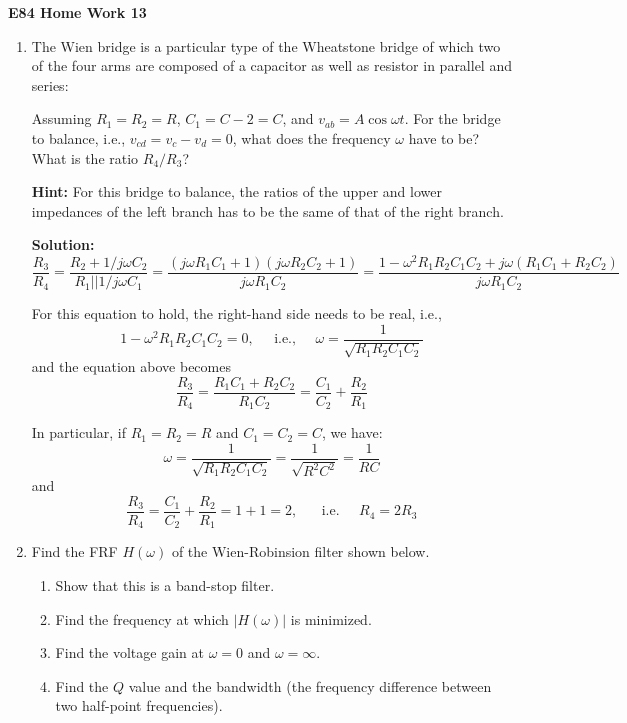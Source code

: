 \usepackage{html}

\begin{center}
{\Large \bf  E84 Home Work 13}
\end{center}
\begin{enumerate}

\item The Wien bridge is a particular type of the Wheatstone bridge 
  of which two of the four arms are composed of a capacitor as well 
  as resistor in parallel and series:


  Assuming $R_1=R_2=R$, $C_1=C-2=C$, and $v_{ab}=A\cos\omega t$. For the
  bridge to balance, i.e., $v_{cd}=v_c-v_d=0$, what does the frequency 
  $\omega$ have to be? What is the ratio $R_4/R_3$?

  {\bf Hint:} For this bridge to balance, the ratios of the upper and
  lower impedances of the left branch has to be the same of that of
  the right branch.

  {\bf Solution:}
  \[
  \frac{R_3}{R_4}=\frac{R_2+1/j\omega C_2}{R_1||1/j\omega C_1}
  =\frac{(j\omega R_1C_1+1)(j\omega R_2C_2+1)}{j\omega R_1C_2}
  =\frac{1-\omega^2R_1R_2C_1C_2+j\omega(R_1C_1+R_2C_2)}{j\omega R_1C_2}
  \]

  For this equation to hold, the right-hand side needs to be real, i.e., 
  \[
  1-\omega^2R_1R_2C_1C_2=0,\;\;\;\;\;\mbox{i.e.,}\;\;\;\;\;
  \omega=\frac{1}{\sqrt{R_1R_2C_1C_2}}
  \]
  and the equation above becomes 
  \[
  \frac{R_3}{R_4}=\frac{R_1C_1+R_2C_2}{R_1C_2}=\frac{C_1}{C_2}+\frac{R_2}{R_1}
  \]

  In particular, if $R_1=R_2=R$ and $C_1=C_2=C$, we have: 
  \[
  \omega=\frac{1}{\sqrt{R_1R_2C_1C_2}}
  =\frac{1}{\sqrt{R^2C^2}}=\frac{1}{RC}
  \]
  and 
  \[
  \frac{R_3}{R_4}=\frac{C_1}{C_2}+\frac{R_2}{R_1}=1+1=2,
  \;\;\;\;\;\;\mbox{i.e.}\;\;\;\;\;R_4=2R_3
  \]

\item Find the FRF $H(\omega)$ of the Wien-Robinsion filter shown below. 


  \begin{enumerate}
  \item Show that this is a band-stop filter.
  \item Find the frequency at which $|H(\omega)|$ is minimized.
  \item Find the voltage gain at $\omega=0$ and $\omega=\infty$.
  \item Find the $Q$ value and the bandwidth (the frequency difference 
    between two half-point frequencies).
  \end{enumerate}


\end{enumerate}
